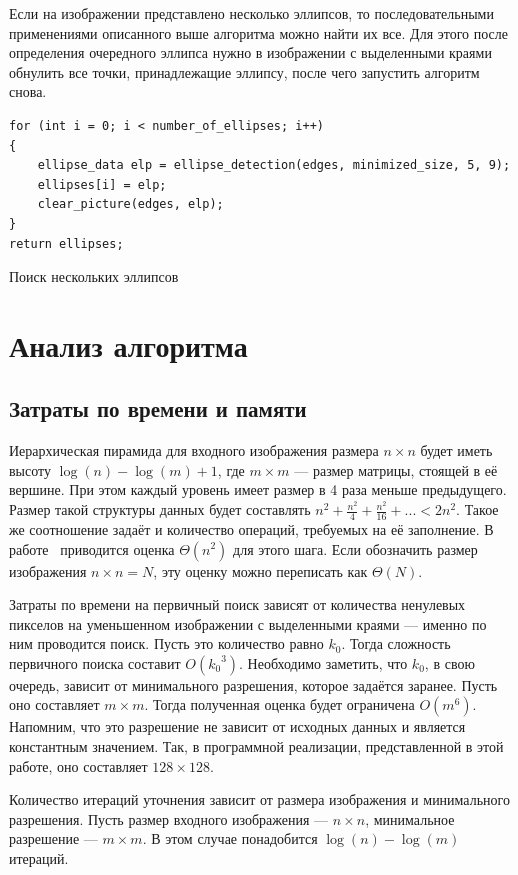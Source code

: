 Если на изображении представлено несколько эллипсов, то последовательными применениями описанного выше алгоритма можно найти их все. 
Для этого после определения очередного эллипса нужно в изображении с выделенными краями обнулить все точки, принадлежащие эллипсу, после чего запустить алгоритм снова.

\begin{ListingEnv}[H]
\begin{lstlisting}
for (int i = 0; i < number_of_ellipses; i++)
{
    ellipse_data elp = ellipse_detection(edges, minimized_size, 5, 9);
    ellipses[i] = elp;
    clear_picture(edges, elp);
}
return ellipses;
\end{lstlisting}
\caption{Поиск нескольких эллипсов}
\label{list:several_ellipses}
\end{ListingEnv}

\section{Анализ алгоритма}
\subsection{Затраты по времени и памяти}
Иерархическая пирамида для входного изображения размера $n \times n$ будет иметь высоту \(\log(n) - \log(m) + 1\), где \(m \times m\) --- размер матрицы, стоящей в её вершине. 
При этом каждый уровень имеет размер в 4 раза меньше предыдущего. Размер такой структуры данных будет составлять \(n^2 + \frac{n^2}{4} + \frac{n^2}{16} + ... < 2n^2\).
Такое же соотношение задаёт и количество операций, требуемых на её заполнение. В работе~\autocite{Chien} приводится оценка \(\Theta(n^2)\) для этого шага. 
Если обозначить размер изображения \(n \times n = N\), эту оценку можно переписать как \(\Theta(N)\).

Затраты по времени на первичный поиск зависят от количества ненулевых пикселов на уменьшенном изображении с выделенными краями --- именно по ним проводится поиск.
Пусть это количество равно \(k_0\). Тогда сложность первичного поиска составит \(O({k_0}^3)\). 
Необходимо заметить, что \(k_0\), в свою очередь, зависит от минимального разрешения, которое задаётся заранее. Пусть оно составляет $m \times m$.
Тогда полученная оценка будет ограничена \(O(m^6)\). Напомним, что это разрешение не зависит от исходных данных и является константным значением. 
Так, в программной реализации, представленной в этой работе, оно составляет \(128 \times 128\).

Количество итераций уточнения зависит от размера изображения и минимального разрешения. Пусть размер входного изображения --- \(n \times n\), минимальное разрешение --- \(m \times m\).
В этом случае понадобится \(\log(n) - \log(m)\) итераций.

